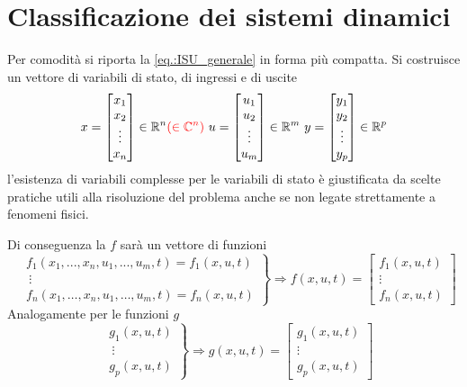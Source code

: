 \section{Classificazione dei sistemi dinamici}
Per comodità si riporta la \ref{eq.:ISU_generale} in forma più compatta.
Si costruisce un vettore di variabili di stato, di ingressi e di uscite
$$
x = \begin{bmatrix}
x_1\\
x_2\\
\vdots\\
x_n
\end{bmatrix} \in \mathbb{R}^n \textcolor{red}{\left(\in\mathbb{C}^n\right)}\
u=\begin{bmatrix}
u_1\\
u_2\\
\vdots\\
u_m
\end{bmatrix}\in\mathbb{R}^m\
y=\begin{bmatrix}
y_1\\
y_2\\
\vdots\\
y_p
\end{bmatrix}\in \mathbb{R}^p
$$
l'esistenza di variabili complesse per le variabili di stato è giustificata da scelte pratiche
utili alla risoluzione del problema anche se non legate strettamente a fenomeni fisici.

Di conseguenza la $f$ sarà un vettore di funzioni
$$\left.\begin{aligned}
&f_1\left(x_1,...,x_n,u_1,...,u_m,t\right)=f_1(x,u,t)\\
&\ \vdots\\
&f_n\left(x_1,\dots,x_n,u_1,\dots,u_m,t\right)=f_n(x,u,t)
\end{aligned}\right\} \Rightarrow f(x,u,t)=\begin{bmatrix}
f_1(x,u,t)\\
\vdots\\
f_n(x,u,t)
\end{bmatrix}
$$
Analogamente per le funzioni $g$
$$
\left.\begin{aligned}
&g_1(x,u,t)\\
&\ \vdots\\
&g_p(x,u,t)
\end{aligned}\right\}\Rightarrow
g(x,u,t) = \begin{bmatrix}
g_1(x,u,t)\\
\vdots\\
g_p(x,u,t)
\end{bmatrix}
$$

